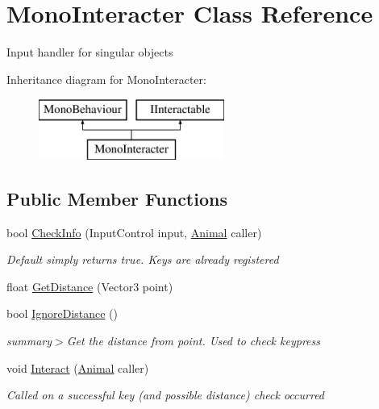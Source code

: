 \hypertarget{class_mono_interacter}{}\section{Mono\+Interacter Class Reference}
\label{class_mono_interacter}


Input handler for singular objects  


Inheritance diagram for Mono\+Interacter\+:\begin{figure}[H]
\begin{center}
\leavevmode
\includegraphics[height=2.000000cm]{class_mono_interacter}
\end{center}
\end{figure}
\subsection*{Public Member Functions}
\begin{DoxyCompactItemize}
\item 
bool \mbox{\hyperlink{class_mono_interacter_ac79722c1e38867f96166dbae403f0110}{Check\+Info}} (Input\+Control input, \mbox{\hyperlink{class_animal}{Animal}} caller)
\begin{DoxyCompactList}\small\item\em Default simply returns true. Keys are already registered \end{DoxyCompactList}\item 
float \mbox{\hyperlink{class_mono_interacter_aa94f17988ac01fa0c8feac0406a775f0}{Get\+Distance}} (Vector3 point)
\item 
bool \mbox{\hyperlink{class_mono_interacter_adbdd4ad781e4fce595a14c2ee6258463}{Ignore\+Distance}} ()
\begin{DoxyCompactList}\small\item\em summary$>$Get the distance from point. Used to check keypress\end{DoxyCompactList}\item 
void \mbox{\hyperlink{class_mono_interacter_ae732e07805c24cad447adf6218658f23}{Interact}} (\mbox{\hyperlink{class_animal}{Animal}} caller)
\begin{DoxyCompactList}\small\item\em Called on a successful key (and possible distance) check occurred\end{DoxyCompactList}\end{DoxyCompactItemize}
